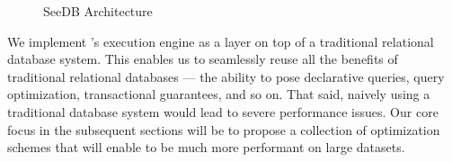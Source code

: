 \begin{figure}[htb]
\vspace{-10pt}
\centerline{
\hbox{}}
\vspace{-18pt}
\caption{SeeDB Architecture}
\label{fig:sys-arch}
\vspace{-12pt}
\end{figure} 

We implement \SeeDB's execution engine as a layer on top of a
traditional relational database system.
This enables us to seamlessly reuse all the benefits
of traditional relational databases --- the ability
to pose declarative queries, query optimization, transactional guarantees,
and so on.
That said, naively using a traditional database system
would lead to severe performance issues.
Our core focus in the subsequent sections will
be to propose a collection of optimization schemes
that will enable \SeeDB to be much more performant 
on large datasets.



